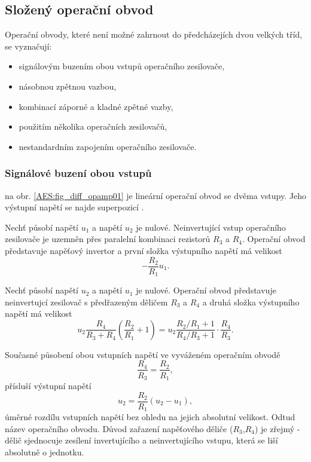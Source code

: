     \subsection{Složený operační obvod}
      Operační obvody, které není možné zahrnout do předcházejích dvou velkých tříd, se vyznačují:
        \begin{itemize}\addtolength{\itemsep}{-0.5\baselineskip}
          \item signálovým buzením obou vstupů operačního zesilovače,
          \item násobnou zpětnou vazbou,
          \item kombinací záporné a kladné zpětné vazby,
          \item použitím několika operačních zesilovačů,
          \item nestandardním zapojením operačního zesilovače.
        \end{itemize}
      \subsubsection{Signálové buzení obou vstupů}
         na obr. \ref{AES:fig_diff_opamp01} je lineární operační obvod se dvěma vstupy. Jeho výstupní napětí se najde superpozicí \cite[s.~126]{Dostal}. 
        
        Nechť působí napětí $u_1$ a napětí $u_2$ je nulové. Neinvertující vstup operačního 
        zesilovače je uzemněn přes paralelní kombinaci rezistorů $R_3$ a $R_4$. Operační obvod 
        představuje napěťový invertor a první složka výstupního napětí má velikost 
        $$-\frac{R_2}{R_1}u_1.$$
        
        Nechť působí napětí $u_2$ a napětí $u_1$ je nulové. Operační obvod představuje neinvertujcí 
        zesilovač s předřazeným děličem $R_3$ a $R_4$ a druhá složka výstupního napětí má velikost 
        $$u_2\frac{R_4}{R_3+R_4}\left(\frac{R_2}{R_1}+1\right)= 
        u_2\frac{R_2/R_1+1}{R_4/R_3+1}\cdot\frac{R_4}{R_3}.$$
        
         
               
        Současné působení obou vstupních napětí ve vyváženém operačním obvodě $$\frac{R_4}{R_3}=\frac{R_2}{R_1},$$ přísluší výstupní napětí 
        \begin{equation}\label{AES:eq_diff_opamp}
          u_2 = \frac{R_2}{R_1}(u_2-u_1),   
        \end{equation}
        úměrné rozdílu vstupních napětí bez ohledu na jejich absolutní velikost. Odtud název 
        operačního obvodu. Důvod zařazení napěťového děliče ($R_3$,$R_4$) je zřejmý - dělič 
        sjednocuje zesílení invertujícího a neinvertujícího vstupu, která se liší absolutně o 
        jednotku. 
        
